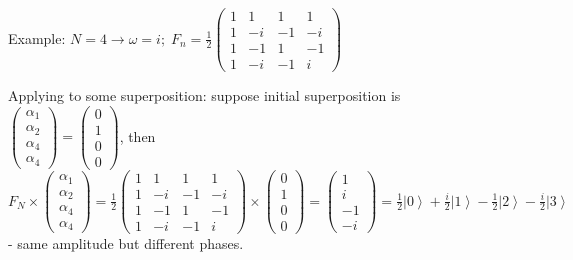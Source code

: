 \documentclass{scrartcl}
\newcommand{\ket}[1]{\left| #1 \right>} %
\newcommand{\half}{\frac12} %
\begin{document}
Example: $N = 4 \to \omega = i; \; F_n = \frac12 \left(
  \begin{array}{cccc}
    1 & 1 & 1 & 1 \\
    1 & -i & -1 & -i \\
    1 & -1 & 1 & -1 \\
    1 & -i & -1 & i 
  \end{array} \right)$

Applying to some superposition: suppose initial superposition is
$\begin{pmatrix} \alpha_1 \\ \alpha_2 \\ \alpha_4 \\ \alpha_4 \end{pmatrix}
= \begin{pmatrix} 0 \\ 1 \\ 0 \\ 0 \end{pmatrix}$, then $F_N
\times \begin{pmatrix} \alpha_1 \\ \alpha_2 \\ \alpha_4 \\
  \alpha_4 \end{pmatrix} = \frac12 \left(
  \begin{array}{cccc}
    1 & 1 & 1 & 1 \\ 1 & -i & -1 & -i \\ 1 & -1 & 1 & -1 \\ 1 & -i & -1 & i 
  \end{array} \right) \times \begin{pmatrix} 0 \\ 1 \\ 0 \\ 0 \end{pmatrix}
= \begin{pmatrix} 1 \\ i \\ -1 \\ -i \end{pmatrix} = \half \ket0 + \frac{i}2
\ket1 - \half \ket2 - \frac{i}2 \ket3$ - same amplitude but different phases.
\end{document}
